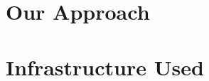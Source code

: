\documentclass[DIV=calc, paper=a4, fontsize=10pt, twocolumn]{scrartcl}	 %
\begin{document}
\section{Our Approach}



\section{Infrastructure Used}






\end{document}

